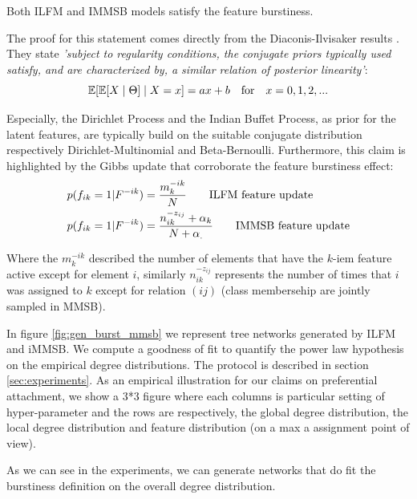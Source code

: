 \begin{proposition}
	Both ILFM and IMMSB models satisfy the feature burstiness.
\end{proposition}

The proof for this statement comes directly from the Diaconis-Ilvisaker results \cite{diaconis1979conjugate}. They state \emph{'subject to regularity conditions, the conjugate priors typically used satisfy, and are characterized by, a  similar relation of posterior linearity'}:
\begin{equation}
\mathbb{E}[\mathbb{E}[X\mid \Theta] \mid X=x] = ax+b \quad \textnormal{for} \quad x=0,1,2,... \nonumber
\end{equation}

Especially, the Dirichlet Process and the Indian Buffet Process, as prior for the latent features, are typically build on the suitable conjugate distribution respectively Dirichlet-Multinomial and Beta-Bernoulli. Furthermore, this claim is highlighted by the Gibbs update that corroborate the feature burstiness effect:
\begin{align}
&p(f_{ik} = 1 | F^{-ik}) = \frac{m_k^{-ik}}{N} \qquad \textnormal{ILFM feature update} \nonumber \\
&p(f_{ik} = 1 | F^{-ik}) = \frac{n_{ik}^{-z_{ij}}+\alpha_k}{N+\alpha_.} \qquad \textnormal{IMMSB feature update} \nonumber \\
\end{align}

Where the $m_k^{-ik}$ described the number of elements that have the $k$-iem feature active except for element $i$, similarly $n_{ik}^{-z_{ij}}$ represents the number of times that $i$ was assigned to $k$ except for relation $(ij)$ (class membersehip are jointly sampled in MMSB).

In figure \ref{fig:gen_burst_mmsb} we represent tree networks generated by ILFM and iMMSB. We compute a goodness of fit to quantify the power law hypothesis on the empirical degree distributions. The protocol is described in section \ref{sec:experiments}. As an empirical illustration for our claims on preferential attachment, we show a 3*3 figure where each columns is particular setting of hyper-parameter and the rows are respectively, the global degree distribution, the local degree distribution and feature distribution (on a max a assignment point of view).

As we can see in the experiments, we can generate networks that do fit the burstiness definition on the overall degree distribution.

